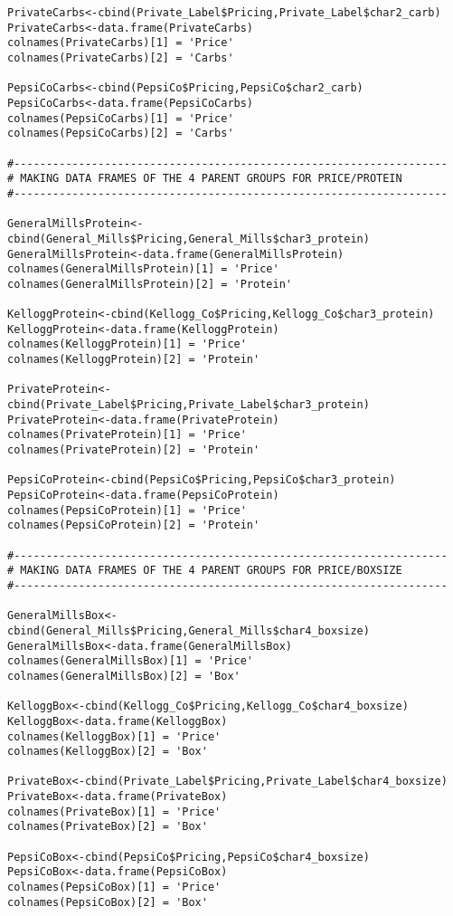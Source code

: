 \documentclass[12pt,english]{article}
\begin{document}
\begin{lstlisting}
PrivateCarbs<-cbind(Private_Label$Pricing,Private_Label$char2_carb)
PrivateCarbs<-data.frame(PrivateCarbs)
colnames(PrivateCarbs)[1] = 'Price'
colnames(PrivateCarbs)[2] = 'Carbs'

PepsiCoCarbs<-cbind(PepsiCo$Pricing,PepsiCo$char2_carb)
PepsiCoCarbs<-data.frame(PepsiCoCarbs)
colnames(PepsiCoCarbs)[1] = 'Price'
colnames(PepsiCoCarbs)[2] = 'Carbs'

#-------------------------------------------------------------------
# MAKING DATA FRAMES OF THE 4 PARENT GROUPS FOR PRICE/PROTEIN
#-------------------------------------------------------------------

GeneralMillsProtein<-cbind(General_Mills$Pricing,General_Mills$char3_protein)
GeneralMillsProtein<-data.frame(GeneralMillsProtein)
colnames(GeneralMillsProtein)[1] = 'Price'
colnames(GeneralMillsProtein)[2] = 'Protein'

KelloggProtein<-cbind(Kellogg_Co$Pricing,Kellogg_Co$char3_protein)
KelloggProtein<-data.frame(KelloggProtein)
colnames(KelloggProtein)[1] = 'Price'
colnames(KelloggProtein)[2] = 'Protein'

PrivateProtein<-cbind(Private_Label$Pricing,Private_Label$char3_protein)
PrivateProtein<-data.frame(PrivateProtein)
colnames(PrivateProtein)[1] = 'Price'
colnames(PrivateProtein)[2] = 'Protein'

PepsiCoProtein<-cbind(PepsiCo$Pricing,PepsiCo$char3_protein)
PepsiCoProtein<-data.frame(PepsiCoProtein)
colnames(PepsiCoProtein)[1] = 'Price'
colnames(PepsiCoProtein)[2] = 'Protein'

#-------------------------------------------------------------------
# MAKING DATA FRAMES OF THE 4 PARENT GROUPS FOR PRICE/BOXSIZE
#-------------------------------------------------------------------

GeneralMillsBox<-cbind(General_Mills$Pricing,General_Mills$char4_boxsize)
GeneralMillsBox<-data.frame(GeneralMillsBox)
colnames(GeneralMillsBox)[1] = 'Price'
colnames(GeneralMillsBox)[2] = 'Box'

KelloggBox<-cbind(Kellogg_Co$Pricing,Kellogg_Co$char4_boxsize)
KelloggBox<-data.frame(KelloggBox)
colnames(KelloggBox)[1] = 'Price'
colnames(KelloggBox)[2] = 'Box'

PrivateBox<-cbind(Private_Label$Pricing,Private_Label$char4_boxsize)
PrivateBox<-data.frame(PrivateBox)
colnames(PrivateBox)[1] = 'Price'
colnames(PrivateBox)[2] = 'Box'

PepsiCoBox<-cbind(PepsiCo$Pricing,PepsiCo$char4_boxsize)
PepsiCoBox<-data.frame(PepsiCoBox)
colnames(PepsiCoBox)[1] = 'Price'
colnames(PepsiCoBox)[2] = 'Box'


\end{lstlisting}
\end{document}

